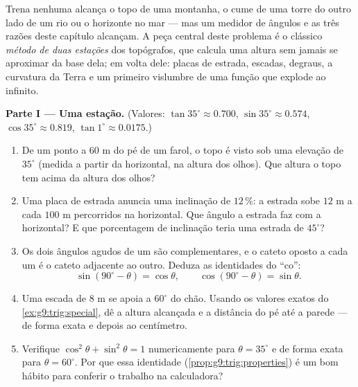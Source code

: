 \begin{problem}
\label{pb:g9:trig:1}
Trena nenhuma alcança o topo de uma montanha, o cume de uma torre do
outro lado de um rio ou o horizonte no mar --- mas um medidor de
ângulos e as três razões deste capítulo alcançam. A peça central deste
problema é o clássico \emph{método de duas estações} dos topógrafos,
que calcula uma altura sem jamais se aproximar da base dela; em volta
dele: placas de estrada, escadas, degraus, a curvatura da Terra e um
primeiro vislumbre de uma função que explode ao infinito.

\medskip
\noindent\textbf{Parte I --- Uma estação.}
(Valores: $\tan 35^\circ \approx 0.700$,
$\sin 35^\circ \approx 0.574$, $\cos 35^\circ \approx 0.819$,
$\tan 1^\circ \approx 0.0175$.)
\begin{enumerate}
  \item De um ponto a $60$ m do pé de um farol, o topo é visto sob uma
        elevação de $35^\circ$ (medida a partir da horizontal, na
        altura dos olhos). Que altura o topo tem acima da altura dos
        olhos?
  \item Uma placa de estrada anuncia uma inclinação de $12\,\%$: a
        estrada sobe $12$ m a cada $100$ m percorridos na horizontal.
        Que ângulo a estrada faz com a horizontal? E que porcentagem de
        inclinação teria uma estrada de $45^\circ$?
  \item Os dois ângulos agudos de um  são
        complementares, e o cateto oposto a cada um é o cateto
        adjacente ao outro. Deduza as identidades do ``co'':
        \[
        \sin(90^\circ - \theta) = \cos\theta,
        \qquad
        \cos(90^\circ - \theta) = \sin\theta .
        \]
  \item Uma escada de $8$ m se apoia a $60^\circ$ do chão. Usando os
        valores exatos do \cref{ex:g9:trig:special}, dê a altura
        alcançada e a distância do pé até a parede --- de forma exata e
        depois ao centímetro.
  \item Verifique $\cos^2\theta + \sin^2\theta = 1$ numericamente para
        $\theta = 35^\circ$ e de forma exata para $\theta = 60^\circ$.
        Por que essa identidade (\cref{prop:g9:trig:properties}) é um
        bom hábito para conferir o trabalho na calculadora?
\end{enumerate}


\end{problem}
